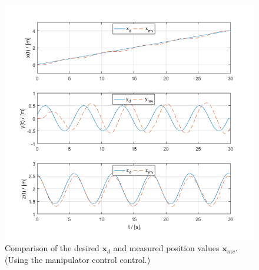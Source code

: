 \begin{figure}[h!]
	\centering
	\includegraphics[width=\columnwidth]{./pictures/manip_traj_pos.png}
	\caption{Comparison of the desired $\textbf{x}_d$ and measured position values $\textbf{x}_{mv}$. (Using the manipulator control control.)}
	\label{fig:manip_pos}
\end{figure}

